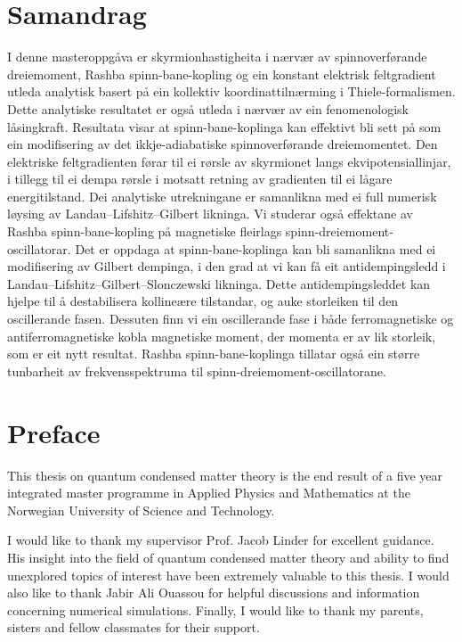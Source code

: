 \documentclass[12pt, a4paper, twoside, openright]{report}
\numberwithin{equation}{chapter}
\numberwithin{figure}{chapter}
\numberwithin{table}{chapter}
\begin{document}
\chapter*{Samandrag}
I denne masteroppgåva er skyrmionhastigheita i nærvær av spinnoverførande dreiemoment, Rashba spinn-bane-kopling og ein konstant elektrisk feltgradient utleda analytisk basert på ein kollektiv koordinattilnærming i Thiele-formalismen. Dette analytiske resultatet er også utleda i nærvær av ein fenomenologisk låsingkraft. Resultata visar at spinn-bane-koplinga kan effektivt bli sett på som ein modifisering av det ikkje-adiabatiske spinnoverførande dreiemomentet. Den elektriske feltgradienten førar til ei rørsle av skyrmionet langs ekvipotensiallinjar, i tillegg til ei dempa rørsle i motsatt retning av gradienten til ei lågare energitilstand. Dei analytiske utrekningane er samanlikna med ei full numerisk løysing av Landau--Lifshitz--Gilbert likninga. Vi studerar også effektane av Rashba spinn-bane-kopling på magnetiske fleirlags spinn-dreiemoment-oscillatorar. Det er oppdaga at spinn-bane-koplinga kan bli samanlikna med ei modifisering av Gilbert dempinga, i den grad at vi kan få eit antidempingsledd i Landau--Lifshitz--Gilbert--Slonczewski likninga. Dette antidempingsleddet kan hjelpe til å destabilisera kollineære tilstandar, og auke storleiken til den oscillerande fasen. Dessuten finn vi ein oscillerande fase i både ferromagnetiske og antiferromagnetiske kobla magnetiske moment, der momenta er av lik storleik, som er eit nytt resultat. Rashba spinn-bane-koplinga tillatar også ein større tunbarheit av frekvensspektruma til spinn-dreiemoment-oscillatorane.
\newpage

\chapter*{Preface}
This thesis on quantum condensed matter theory is the end result of a five year integrated master programme in Applied Physics and Mathematics at the Norwegian University of Science and Technology.

I would like to thank my supervisor Prof. Jacob Linder for excellent guidance. His insight into the field of quantum condensed matter theory and ability to find unexplored topics of interest have been extremely valuable to this thesis. I would also like to thank Jabir Ali Ouassou for helpful discussions and information concerning numerical simulations. Finally, I would like to thank my parents, sisters and fellow classmates for their support. \\
\end{document}
